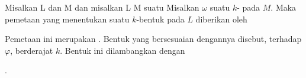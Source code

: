 {}
{

Misalkan
\mathkor {} {L} {dan} {M} {}
dan misalkan
\maabbdisp {\varphi} { L } { M
} {}
suatu
Misalkan $\omega$ suatu $k$-
pada $M$. Maka pemetaan yang menentukan suatu $k$-bentuk pada $L$ diberikan oleh

 {  }

Pemetaan ini merupakan
.
Bentuk yang bersesuaian dengannya disebut, terhadap $\varphi$,  berderajat $k$. Bentuk ini dilambangkan dengan

\mathdisp {\varphi^* \omega} {  }.

}



